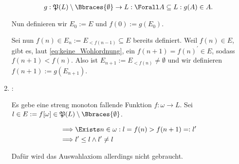\begin{solution}
\begin{enumerate}[label = \texttt{ad}]
    \begin{align*}
        g:
        \mathfrak{P}(L) \setminus \Bbraces{\emptyset} \to L:
            \Forall A \subseteq L:
                g(A) \in A.
    \end{align*}

    Nun definieren wir $E_0 := E$ und $f(0) := g(E_0)$.

    Sei nun $f(n) \in E_{n} := E_{< f(n-1)} \subseteq E$ bereits definiert.
    Weil $f(n) \in E$, gibt es, laut \eqref{eq:keine_Wohlordnung}, ein $f(n + 1) = f(n)^\prime \in E$, sodass $f(n + 1) < f(n)$.
    Also ist $E_{n+1} := E_{<f(n)} \neq \emptyset$ und wir definieren $f(n+1) := g(E_{n+1})$.

    \item \Quote{$\impliedby$}:

    Es gebe eine streng monoton fallende Funktion $f: \omega \to L$.
    Sei $l \in E := f[\omega] \in \mathfrak{P}(L) \setminus \Bbraces{\emptyset}$.

    \begin{align*}
        \implies &
        \Exists n \in \omega:
            l = f(n) > f(n + 1) =: l^\prime \\
        \implies &
        l^\prime \leq l \land l^\prime \neq l
    \end{align*}

    Dafür wird das Auswahlaxiom allerdings nicht gebraucht.

\end{enumerate}

\end{solution}

